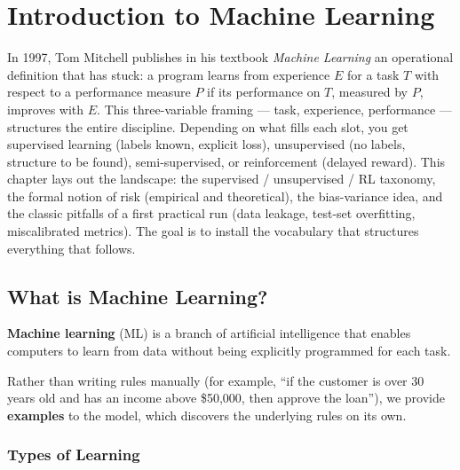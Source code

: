 \chapter{Introduction to Machine Learning}
\label{ch:ml_intro}

In 1997, Tom Mitchell publishes in his textbook \emph{Machine Learning} an operational definition that has stuck: a program learns from experience $E$ for a task $T$ with respect to a performance measure $P$ if its performance on $T$, measured by $P$, improves with $E$. This three-variable framing --- task, experience, performance --- structures the entire discipline. Depending on what fills each slot, you get supervised learning (labels known, explicit loss), unsupervised (no labels, structure to be found), semi-supervised, or reinforcement (delayed reward). This chapter lays out the landscape: the supervised / unsupervised / RL taxonomy, the formal notion of risk (empirical and theoretical), the bias-variance idea, and the classic pitfalls of a first practical run (data leakage, test-set overfitting, miscalibrated metrics). The goal is to install the vocabulary that structures everything that follows.

\section{What is Machine Learning?}

\begin{definition}
\textbf{Machine learning} (ML) is a branch of artificial intelligence that enables computers to learn from data without being explicitly programmed for each task.
\end{definition}

\begin{intuition}
Rather than writing rules manually (for example, ``if the customer is over 30 years old and has an income above \$50,000, then approve the loan''), we provide \textbf{examples} to the model, which discovers the underlying rules on its own.
\end{intuition}

\subsection{Types of Learning}


